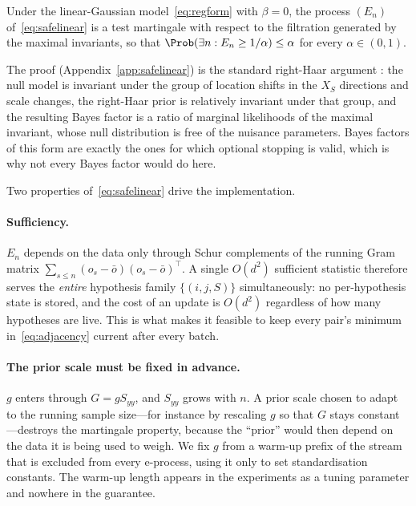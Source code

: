 \begin{proposition}\label{prop:safelinear}
Under the linear-Gaussian model~\eqref{eq:regform} with $\beta = 0$, the
process $(E_n)$ of~\eqref{eq:safelinear} is a test martingale with respect to
the filtration generated by the maximal invariants, so that
$\Prob(\exists n: E_n \ge 1/\alpha) \le \alpha$ for every $\alpha \in (0,1)$.
\end{proposition}

The proof (Appendix~\ref{app:safelinear}) is the standard right-Haar argument
\citep{berger1998bayes,hendriksen2021optional}: the null model is invariant
under the group of location shifts in the $X_S$ directions and scale changes,
the right-Haar prior is relatively invariant under that group, and the
resulting Bayes factor is a ratio of marginal likelihoods of the maximal
invariant, whose null distribution is free of the nuisance parameters. Bayes
factors of this form are exactly the ones for which optional stopping is
valid, which is why not every Bayes factor would do here.

Two properties of~\eqref{eq:safelinear} drive the implementation.

\paragraph{Sufficiency.} $E_n$ depends on the data only through Schur
complements of the running Gram matrix
$\sum_{s \le n} (o_s - \bar o)(o_s - \bar o)^\top$. A single $O(d^2)$
sufficient statistic therefore serves the \emph{entire} hypothesis family
$\{(i,j,S)\}$ simultaneously: no per-hypothesis state is stored, and the cost
of an update is $O(d^2)$ regardless of how many hypotheses are live. This is
what makes it feasible to keep every pair's minimum
in~\eqref{eq:adjacency} current after every batch.

\paragraph{The prior scale must be fixed in advance.} $g$ enters
through $G = g S_{yy}$, and $S_{yy}$ grows with $n$. A prior scale chosen to
adapt to the running sample size---for instance by rescaling $g$ so that $G$
stays constant---destroys the martingale property, because the ``prior'' would
then depend on the data it is being used to weigh. We fix $g$ from a warm-up
prefix of the stream that is excluded from every e-process, using it only to
set standardisation constants. The warm-up length appears in the experiments
as a tuning parameter and nowhere in the guarantee.

